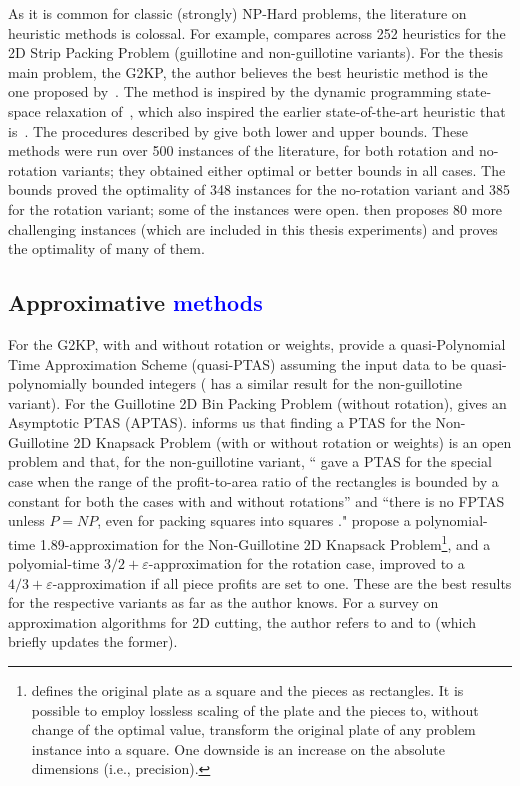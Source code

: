 \documentclass[ppgc,tese,english,formais,babel]{iiufrgs}
\newif\iffinalversion
\newcommand{\newtext}[1]{\iffinalversion%
#1%
\else%
\textcolor{blue}{#1}%
\fi%
}
\begin{document}
As it is common for classic (strongly) NP-Hard problems, the literature on heuristic methods is colossal.
For example, \citet{ortmann:2010} compares across 252 heuristics for the 2D Strip Packing Problem (guillotine and non-guillotine variants).
For the thesis main problem, the G2KP, the author believes the best heuristic method is the one proposed by~\citet{velasco:2019}.
The method is inspired by the dynamic programming state-space relaxation of~\citet{nicos:1995:ssr}, which also inspired the earlier state-of-the-art heuristic that is~\citet{morabito:2010}.
The procedures described by \citet{velasco:2019} give both lower and upper bounds.
These methods were run over 500 instances of the literature, for both rotation and no-rotation variants; they obtained either optimal or better bounds in all cases.
The bounds proved the optimality of 348 instances for the no-rotation variant and 385 for the rotation variant; some of the instances were open.
\citet{velasco:2019} then proposes 80 more challenging instances (which are included in this thesis experiments) and proves the optimality of many of them.

\subsection{Approximative \newtext{methods}}

For the G2KP, with and without rotation or weights, \citet{abed:2015} provide a quasi-Polynomial Time Approximation Scheme (quasi-PTAS) assuming the input data to be quasi-polynomially bounded integers (\citet{anna:2015:quasi} has a similar result for the non-guillotine variant).
For the Guillotine 2D Bin Packing Problem (without rotation), \citet{bansal:2005} gives an Asymptotic PTAS (APTAS).
\citet{christensen:2017} informs us that finding a PTAS for the Non-Guillotine 2D Knapsack Problem (with or without rotation or weights) is an open problem and that, for the non-guillotine variant, ``\citet{bansal:2009} gave a PTAS for the special case when the range of the profit-to-area ratio of the rectangles is bounded by a constant for both the cases with and without rotations'' and ``there is no FPTAS unless \(P = NP\), even for packing squares into squares \citep{leung:1990}."
\citet{galvez:2017} propose a polynomial-time 1.89-approximation for the Non-Guillotine 2D Knapsack Problem\footnote{\citet{galvez:2017} defines the original plate as a square and the pieces as rectangles. It is possible to employ lossless scaling of the plate and the pieces to, without change of the optimal value, transform the original plate of any problem instance into a square. One downside is an increase on the absolute dimensions (i.e., precision).}, and a polyomial-time \(3/2 + \varepsilon\)-approximation for the rotation case, improved to a \(4/3 + \varepsilon\)-approximation if all piece profits are set to one.
These are the best results for the respective variants as far as the author knows.
For a survey on approximation algorithms for 2D cutting, the author refers to \citet{christensen:2017} and to \citet{iori:2020} (which briefly updates the former).
\end{document}
